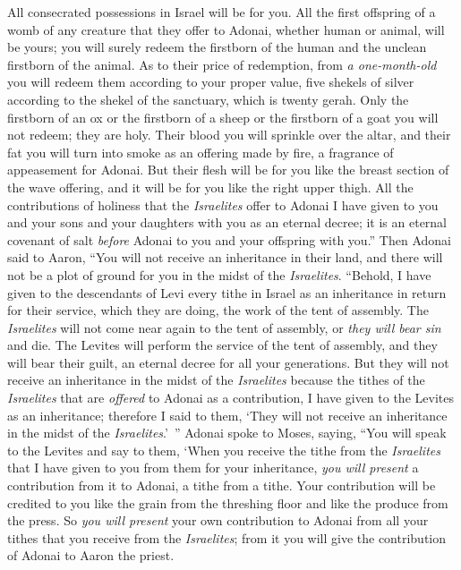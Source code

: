 \begin{biblechapter}
\verse All consecrated possessions in Israel will be for you.
\verse All the first offspring of a womb of any creature that they offer to Adonai, whether human or animal, will be yours; you will surely redeem the firstborn of the human and the unclean firstborn of the animal.
\verse As to their price of redemption, from \textit{a one-month-old} you will redeem them according to your proper value, five shekels of silver according to the shekel of the sanctuary, which is twenty gerah.
\verse Only the firstborn of an ox or the firstborn of a sheep or the firstborn of a goat you will not redeem; they are holy. Their blood you will sprinkle over the altar, and their fat you will turn into smoke as an offering made by fire, a fragrance of appeasement for Adonai.
\verse But their flesh will be for you like the breast section of the wave offering, and it will be for you like the right upper thigh.
\verse All the contributions of holiness that the \textit{Israelites} offer to Adonai I have given to you and your sons and your daughters with you as an eternal decree; it is an eternal covenant of salt \textit{before} Adonai to you and your offspring with you.”
\verse Then Adonai said to Aaron, “You will not receive an inheritance in their land, and there will not be a plot of ground for you in the midst of the \textit{Israelites}.
\verse “Behold, I have given to the descendants of Levi every tithe in Israel as an inheritance in return for their service, which they are doing, the work of the tent of assembly.
\verse The \textit{Israelites} will not come near again to the tent of assembly, or \textit{they will bear sin} and die.
\verse The Levites will perform the service of the tent of assembly, and they will bear their guilt, an eternal decree for all your generations. But they will not receive an inheritance in the midst of the \textit{Israelites}
\verse because the tithes of the \textit{Israelites} that are \textit{offered} to Adonai as a contribution, I have given to the Levites as an inheritance; therefore I said to them, ‘They will not receive an inheritance in the midst of the \textit{Israelites}.’ ”
\verse Adonai spoke to Moses, saying,
\verse “You will speak to the Levites and say to them, ‘When you receive the tithe from the \textit{Israelites} that I have given to you from them for your inheritance, \textit{you will present} a contribution from it to Adonai, a tithe from a tithe.
\verse Your contribution will be credited to you like the grain from the threshing floor and like the produce from the press.
\verse So \textit{you will present} your own contribution to Adonai from all your tithes that you receive from the \textit{Israelites}; from it you will give the contribution of Adonai to Aaron the priest.

\end{biblechapter}
